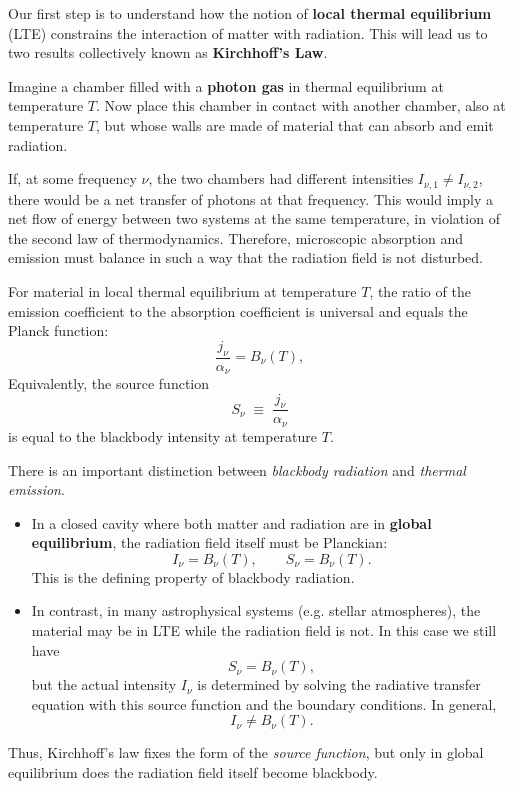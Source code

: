 Our first step is to understand how the notion of \textbf{local thermal equilibrium} (LTE) constrains the interaction of matter with radiation. This will lead us to two results collectively known as \textbf{Kirchhoff's Law}. 

\begin{center}
    Imagine a chamber filled with a \textbf{photon gas} in thermal equilibrium at temperature $T$. Now place this chamber in contact with another chamber, also at temperature $T$, but whose walls are made of material that can absorb and emit radiation.
\end{center}

If, at some frequency $\nu$, the two chambers had different intensities $I_{\nu,1} \neq I_{\nu,2}$, there would be a net transfer of photons at that frequency. This would imply a net flow of energy between two systems at the same temperature, in violation of the second law of thermodynamics. Therefore, microscopic absorption and emission must balance in such a way that the radiation field is not disturbed. 

\begin{theorem}
For material in local thermal equilibrium at temperature $T$, the ratio of the emission coefficient to the absorption coefficient is universal and equals the Planck function:
\[
\frac{j_\nu}{\alpha_\nu} = B_\nu(T),
\]
Equivalently, the source function
\[
S_\nu \;\equiv\; \frac{j_\nu}{\alpha_\nu}
\]
is equal to the blackbody intensity at temperature $T$.
\end{theorem}

\begin{remark}
There is an important distinction between \emph{blackbody radiation} and \emph{thermal emission}. 
\begin{itemize}
    \item In a closed cavity where both matter and radiation are in \textbf{global equilibrium}, the radiation field itself must be Planckian:
    \[
    I_\nu = B_\nu(T), \qquad S_\nu = B_\nu(T).
    \]
    This is the defining property of blackbody radiation. 

    \item In contrast, in many astrophysical systems (e.g. stellar atmospheres), the material may be in LTE while the radiation field is not. In this case we still have
    \[
    S_\nu = B_\nu(T),
    \]
    but the actual intensity $I_\nu$ is determined by solving the radiative transfer equation with this source function and the boundary conditions. In general,
    \[
    I_\nu \neq B_\nu(T).
    \]
\end{itemize}
Thus, Kirchhoff's law fixes the form of the \emph{source function}, but only in global equilibrium does the radiation field itself become blackbody.
\end{remark}
